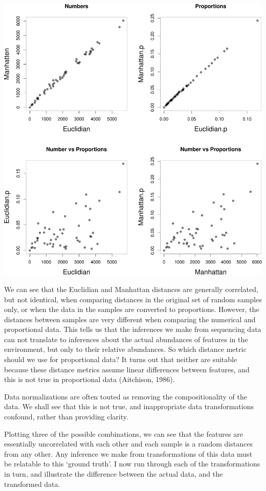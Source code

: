 \documentclass[twocolumn]{article}
\begin{document}
\includegraphics{main_files/figure-latex/R_block_dist-1.pdf}

We can see that the Euclidian and Manhattan distances are generally
correlated, but not identical, when comparing distances in the original
set of random samples only, or when the data in the samples are
converted to proportions. However, the distances between samples are
very different when comparing the numerical and proportional data. This
tells us that the inferences we make from sequencing data can not
translate to inferences about the actual abundances of features in the
environment, but only to their relative abundances. So which distance
metric should we use for proportional data? It turns out that neither
are suitable because these distance metrics assume linear differences
between features, and this is not true in proportional data (Aitchison,
1986).

Data normalizations are often touted as removing the compositionality of
the data. We shall see that this is not true, and inappropriate data
transformations confound, rather than providing clarity.

Plotting three of the possible combinations, we can see that the
features are essentially uncorrelated with each other and each sample is
a random distances from any other. Any inference we make from
transformations of this data must be relatable to this `ground truth'. I
now run through each of the transformations in turn, and illustrate the
difference between the actual data, and the transformed data.
\end{document}
